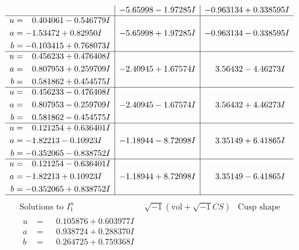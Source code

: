 \documentclass[1p]{elsarticle_modified}
\theoremstyle{definition}
\newcommand{\I}{\sqrt{-1}}
\begin{document}
$$\begin{array}{c|c|c}
 & -5.65998 - 1.97285 I & -0.963134 + 0.338595 I \\ \hline\begin{aligned}
u &= \phantom{-}0.404061 - 0.546779 I \\
a &= -1.53472 + 0.82950 I \\
b &= -0.103415 + 0.768073 I\end{aligned}
 & -5.65998 + 1.97285 I & -0.963134 - 0.338595 I \\ \hline\begin{aligned}
u &= \phantom{-}0.456233 + 0.476408 I \\
a &= \phantom{-}0.807953 + 0.259709 I \\
b &= \phantom{-}0.581862 + 0.454575 I\end{aligned}
 & -2.40945 + 1.67574 I & \phantom{-}3.56432 - 4.46273 I \\ \hline\begin{aligned}
u &= \phantom{-}0.456233 - 0.476408 I \\
a &= \phantom{-}0.807953 - 0.259709 I \\
b &= \phantom{-}0.581862 - 0.454575 I\end{aligned}
 & -2.40945 - 1.67574 I & \phantom{-}3.56432 + 4.46273 I \\ \hline\begin{aligned}
u &= \phantom{-}0.121254 + 0.636401 I \\
a &= -1.82213 - 0.10923 I \\
b &= -0.352065 - 0.838752 I\end{aligned}
 & -1.18944 - 8.72098 I & \phantom{-}3.35149 + 6.41865 I \\ \hline\begin{aligned}
u &= \phantom{-}0.121254 - 0.636401 I \\
a &= -1.82213 + 0.10923 I \\
b &= -0.352065 + 0.838752 I\end{aligned}
 & -1.18944 + 8.72098 I & \phantom{-}3.35149 - 6.41865 I\\
 \hline 
 \end{array}$$\newpage$$\begin{array}{c|c|c}  
\text{Solutions to }I^u_{1}& \I (\text{vol} + \sqrt{-1}CS) & \text{Cusp shape}\\
 \hline 
\begin{aligned}
u &= \phantom{-}0.105876 + 0.603977 I \\
a &= \phantom{-}0.938724 + 0.288370 I \\
b &= \phantom{-}0.264725 + 0.759368 I\end{aligned}

\end{array}$$
\end{document}
